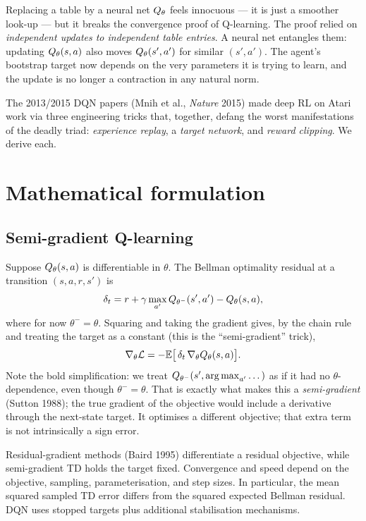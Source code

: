 \documentclass[11pt,oneside]{scrbook}
\begin{document}
\begin{intuition}
Replacing a table by a neural net $Q_\theta$ feels innocuous --- it is just a smoother
look-up --- but it breaks the convergence proof of Q-learning. The proof relied on
\emph{independent updates to independent table entries}. A neural net entangles them:
updating $Q_\theta(s,a)$ also moves $Q_\theta(s',a')$ for similar $(s',a')$. The
agent's bootstrap target now depends on the very parameters it is trying to learn, and the
update is no longer a contraction in any natural norm.
\end{intuition}

The 2013/2015 DQN papers (Mnih et al., \emph{Nature} 2015) made deep RL on Atari work via
three engineering tricks that, together, defang the worst manifestations of the deadly
triad: \emph{experience replay}, a \emph{target network}, and \emph{reward clipping}. We
derive each.

\chapter{Mathematical formulation}

\section{Semi-gradient Q-learning}

Suppose $Q_\theta(s,a)$ is differentiable in $\theta$. The Bellman optimality residual
at a transition $(s,a,r,s')$ is
\[
  \delta_t = r + \gamma \max_{a'} Q_{\theta^-}(s', a') - Q_\theta(s, a),
\]
where for now $\theta^- = \theta$. Squaring and taking the gradient gives, by the chain
rule and treating the target as a constant (this is the ``semi-gradient'' trick),
\begin{equation}
  \nabla_\theta \mathcal{L} = -\mathbb{E}\bigl[\,\delta_t \,\nabla_\theta Q_\theta(s,a)\bigr].
  \label{eq:semi-grad}
\end{equation}
Note the bold simplification: we treat $Q_{\theta^-}(s',\operatorname*{arg\,max}_{a'}\dots)$ as if it
had no $\theta$-dependence, even though $\theta^- = \theta$. That is exactly what makes
this a \emph{semi-gradient} (Sutton 1988); the true gradient of the objective would
include a derivative through the next-state target. It optimises a different
objective; that extra term is not intrinsically a sign error.

\begin{remark}
Residual-gradient methods (Baird 1995) differentiate a residual objective,
while semi-gradient TD holds the target fixed. Convergence and speed depend
on the objective, sampling, parameterisation, and step sizes. In particular,
the mean squared sampled TD error differs from the squared expected Bellman
residual. DQN uses stopped targets plus additional stabilisation mechanisms.
\end{remark}
\end{document}
